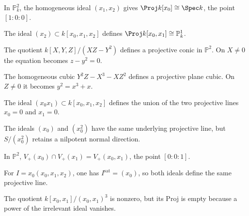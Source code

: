 \begin{example}\label{ex:vi37-01}
In \(\mathbb P^2_k\), the homogeneous ideal \((x_1,x_2)\) gives \(\Proj k[x_0]\cong\Spec k\), the point \([1:0:0]\).
\end{example}

\begin{example}\label{ex:vi37-02}
The ideal \((x_2)\subset k[x_0,x_1,x_2]\) defines \(\Proj k[x_0,x_1]\cong\mathbb P^1_k\).
\end{example}

\begin{example}[A conic]\label{ex:vi37-03}
The quotient \(k[X,Y,Z]/(XZ-Y^2)\) defines a projective conic in \(\mathbb P^2\).  On \(X\ne0\) the equation becomes \(z-y^2=0\).
\end{example}

\begin{example}\label{ex:vi37-04}
The homogeneous cubic \(Y^2Z-X^3-XZ^2\) defines a projective plane cubic.  On \(Z\ne0\) it becomes \(y^2=x^3+x\).
\end{example}

\begin{example}\label{ex:vi37-05}
The ideal \((x_0x_1)\subset k[x_0,x_1,x_2]\) defines the union of the two projective lines \(x_0=0\) and \(x_1=0\).
\end{example}

\begin{example}\label{ex:vi37-06}
The ideals \((x_0)\) and \((x_0^2)\) have the same underlying projective line, but \(S/(x_0^2)\) retains a nilpotent normal direction.
\end{example}

\begin{example}\label{ex:vi37-07}
In \(\mathbb P^2\), \(V_+(x_0)\cap V_+(x_1)=V_+(x_0,x_1)\), the point \([0:0:1]\).
\end{example}

\begin{example}\label{ex:vi37-08}
For \(I=x_0(x_0,x_1,x_2)\), one has \(I^{\mathrm{sat}}=(x_0)\), so both ideals define the same projective line.
\end{example}

\begin{example}\label{ex:vi37-09}
The quotient \(k[x_0,x_1]/(x_0,x_1)^3\) is nonzero, but its Proj is empty because a power of the irrelevant ideal vanishes.
\end{example}

